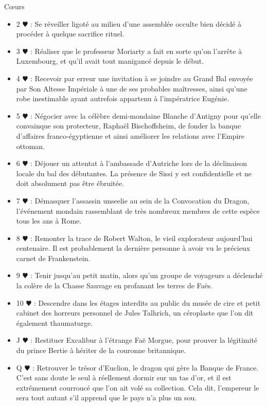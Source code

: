 \documentclass[a5paper,pagesize,french]{book}
\begin{document}
Cœurs
\begin{itemize}
	\item[] 2{\color{red} $\varheart$ } : Se réveiller ligoté au milieu d'une assemblée occulte bien décidé à procéder à quelque sacrifice rituel.
	\item[] 3{\color{red} $\varheart$ } : Réaliser que le professeur Moriarty a fait en sorte qu'on l'arrête à Luxembourg, et qu'il avait tout manigancé depuis le début.
	\item[] 4{\color{red} $\varheart$ } : Recevoir par erreur une invitation à se joindre au Grand Bal envoyée par Son Altesse Impériale à une de ses probables maîtresses, ainsi qu'une robe inestimable ayant autrefois appartenu à l'impératrice Eugénie.
	\item[] 5{\color{red} $\varheart$ } : Négocier avec la célèbre demi-mondaine Blanche d'Antigny pour qu'elle convainque son protecteur, Raphaël Bischoffsheim, de fonder la banque d'affaires franco-égyptienne et ainsi améliorer les relations avec l'Empire ottoman.
	\item[] 6{\color{red} $\varheart$ } : Déjouer un attentat à l'ambassade d'Autriche lors de la déclinaison locale du bal des débutantes. La présence de Sissi y est confidentielle et ne doit absolument pas être ébruitée. 
	\item[] 7{\color{red} $\varheart$ } : Démasquer l'assassin unseelie au sein de la Convocation du Dragon, l'événement mondain rassemblant de très nombreux membres de cette espèce tous les ans à Rome.
	\item[] 8{\color{red} $\varheart$ } : Remonter la trace de Robert Walton, le vieil explorateur aujourd'hui centenaire. Il est probablement la dernière personne à avoir vu le précieux carnet de Frankenstein.
	\item[] 9{\color{red} $\varheart$ } : Tenir jusqu'au petit matin, alors qu'un groupe de voyageurs a déclenché la colère de la Chasse Sauvage en profanant les terres de Faës.
	\item[] 10{\color{red} $\varheart$ } : Descendre dans les étages interdits au public du musée de cire et petit cabinet des horreurs personnel de Jules Talhrich, un céroplaste que l'on dit également thaumaturge.
	\item[] J{\color{red} $\varheart$ } : Restituer Excalibur à l'étrange Faë Morgue, pour prouver la légitimité du prince Bertie à hériter de la couronne britannique.
	\item[] Q{\color{red} $\varheart$ } : Retrouver le trésor d'Euclion, le dragon qui gère la Banque de France. C'est sans doute le seul à réellement dormir sur un tas d'or, et il est extrêmement courroucé que l'on ait volé sa collection. Cela dit, l'empereur le sera tout autant s'il apprend que le pays n'a plus un sou.

\end{itemize}
\end{document}
